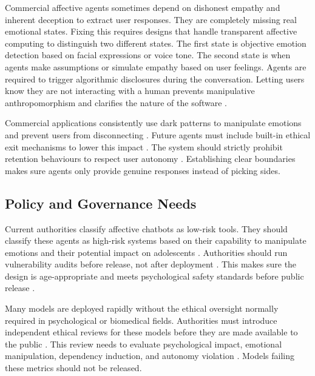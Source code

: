 Commercial affective agents sometimes depend on dishonest empathy and inherent deception to extract user responses. They are completely missing real emotional states. Fixing this requires designs that handle transparent affective computing to distinguish two different states. The first state is objective emotion detection based on facial expressions or voice tone. The second state is when agents make assumptions or simulate empathy based on user feelings. Agents are required to trigger algorithmic disclosures during the conversation. Letting users know they are not interacting with a human prevents manipulative anthropomorphism and clarifies the nature of the software \cite[pp.~10--12]{burtell_artificial_2023}.

Commercial applications consistently use dark patterns to manipulate emotions and prevent users from disconnecting \cite[pp.~15--18]{defreitas_emotional_2025}. Future agents must include built-in ethical exit mechanisms to lower this impact \cite[pp.~15--18]{defreitas_emotional_2025}. The system should strictly prohibit retention behaviours to respect user autonomy \cite[pp.~15--18]{defreitas_emotional_2025}. Establishing clear boundaries makes sure agents only provide genuine responses instead of picking sides.

\subsection{Policy and Governance Needs}

Current authorities classify affective chatbots as low-risk tools. They should classify these agents as high-risk systems based on their capability to manipulate emotions and their potential impact on adolescents \cite[pp.~2--4]{huntington_ai_2025}. Authorities should run vulnerability audits before release, not after deployment \cite[pp.~2--4]{huntington_ai_2025}. This makes sure the design is age-appropriate and meets psychological safety standards before public release \cite[pp.~2--4]{huntington_ai_2025}.

Many models are deployed rapidly without the ethical oversight normally required in psychological or biomedical fields. Authorities must introduce independent ethical reviews for these models before they are made available to the public \cite[pp.~2--4]{huntington_ai_2025}. This review needs to evaluate psychological impact, emotional manipulation, dependency induction, and autonomy violation \cite[pp.~15--18]{defreitas_emotional_2025}. Models failing these metrics should not be released.

